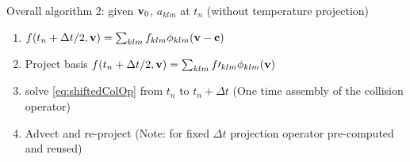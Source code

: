 \documentclass{article}[draft]
\begin{document}
\newpage
Overall algorithm 2: given $\mathbf{v}_0$, $a_{klm}$ at $t_n$ (without temperature projection)
\begin{enumerate}
	\item $f(t_n + \Delta t /2, \vect{v} ) = \sum_{klm} f_{klm} \phi_{klm}\of{\vect{v}-\vect{c}} $ %
	\item Project basis $f(t_n + \Delta t /2, \mathbf{v} )= \sum_{klm} f\prime_{klm} \phi_{klm}(\mathbf{v})$
	\item solve \eqref{eq:shiftedColOp} from $t_n$ to $t_n + \Delta t$ (One time assembly of the collision operator)
	\item Advect and re-project (Note: for fixed $\Delta t $ projection operator pre-computed and reused) 
\end{enumerate}






%
\clearpage
\end{document}
